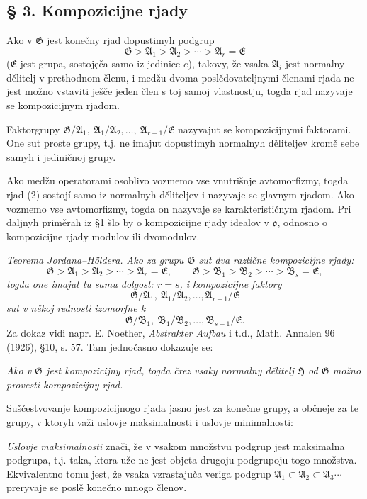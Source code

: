 \documentclass[11pt]{article}
\providecommand{\mG}{\mathfrak{G}}
\providecommand{\mA}{\mathfrak{A}}
\providecommand{\mB}{\mathfrak{B}}
\providecommand{\mE}{\mathfrak{E}}
\providecommand{\mH}{\mathfrak{H}}
\providecommand{\mo}{\mathfrak{o}}
\begin{document}
\setcounter{footnote}{10}

\subsection*{§ 3. Kompozicijne rjady}

Ako v $\mG$ jest konečny rjad dopustimyh podgrup
\[
        \mG>\mA_1>\mA_2>\cdots>\mA_r=\mE \tag{2}
\]
($\mE$ jest grupa, sostojęča samo iz jedinice $e$), takovy, že vsaka $\mA_i$ jest normalny dělitelj v prethodnom členu, i medžu dvoma poslědovateljnymi členami rjada ne jest možno vstaviti ješče jeden člen s toj samoj vlastnostju, togda rjad nazyvaje se kompozicijnym rjadom.

Faktorgrupy $\mG/\mA_1,\ \mA_1/\mA_2,\ldots,\ \mA_{r-1}/\mE$ nazyvajut se kompozicijnymi faktorami. One sut proste grupy, t.j. ne imajut dopustimyh normalnyh děliteljev kromě sebe samyh i jediničnoj grupy.

Ako medžu operatorami osoblivo vozmemo vse vnutrišnje avtomorfizmy, togda rjad (2) sostojí samo iz normalnyh děliteljev i nazyvaje se glavnym rjadom. Ako vozmemo vse avtomorfizmy, togda on nazyvaje se karakterističnym rjadom. Pri daljnyh priměrah iz §1 šlo by o kompozicijne rjady idealov v $\mo$, odnosno o kompozicijne rjady modulov ili dvomodulov.

\emph{Teorema Jordana--Höldera.} \emph{Ako za grupu $\mG$ sut dva različne kompozicijne rjady:}
\[
        \mG>\mA_1>\mA_2>\cdots>\mA_r=\mE,
        \qquad
        \mG>\mB_1>\mB_2>\cdots>\mB_s=\mE,
\]
\emph{togda one imajut tu samu dolgost: $r=s$, i kompozicijne faktory}
\[
        \mG/\mA_1,\ \mA_1/\mA_2,\ldots,\mA_{r-1}/\mE
\]
\emph{sut v někoj rednosti izomorfne k}
\[
        \mG/\mB_1,\ \mB_1/\mB_2,\ldots,\mB_{s-1}/\mE.
\]
Za dokaz vidi napr. E. Noether, \emph{Abstrakter Aufbau} i t.d., Math. Annalen 96 (1926), §10, s. 57. Tam jednočasno dokazuje se:

\emph{Ako v $\mG$ jest kompozicijny rjad, togda črez vsaky normalny dělitelj $\mH$ od $\mG$ možno provesti kompozicijny rjad.}

Suščestvovanje kompozicijnogo rjada jasno jest za konečne grupy, a občneje za te grupy, v ktoryh važi uslovje maksimalnosti i uslovje minimalnosti:

\emph{Uslovje maksimalnosti} znači, že v vsakom množstvu podgrup jest maksimalna podgrupa, t.j. taka, ktora uže ne jest objeta drugoju podgrupoju togo množstva. Ekvivalentno tomu jest, že vsaka vzrastajuča veriga podgrup $\mA_1\subset\mA_2\subset\mA_3\cdots$ preryvaje se poslě konečno mnogo členov.
\end{document}
